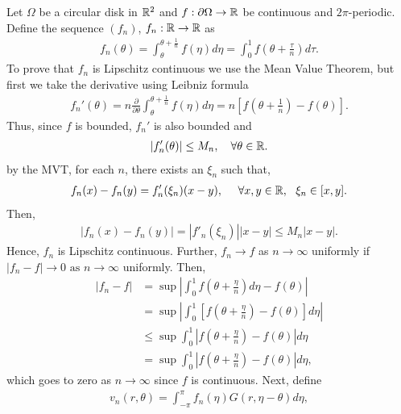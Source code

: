 \begin{questions}
\begin{solution}
Let $\Omega$ be a circular disk in $\mathbb{R}^2$ and $f:\partial \Omega\rightarrow\mathbb{R}$ be continuous and $2\pi$-periodic. Define the sequence $(f_n)$, $f_n:\mathbb{R}\rightarrow\mathbb{R}$ as
\begin{align*}
f_n(\theta)=\int_\theta^{\theta+\frac{1}{n}}f(\eta)d\eta=\int_0^1f(\theta+\frac{\tau}{n})d\tau.
\end{align*}
To prove that $f_n$ is Lipschitz continuous we use the Mean Value Theorem, but first we take the derivative using Leibniz formula
\begin{align*}
f_n'(\theta)=n\frac{\partial}{\partial\theta}\int_\theta^{\theta+\frac{1}{n}}f(\eta)d\eta=n\left[f\left(\theta+\frac{1}{n}\right)-f(\theta)\right].
\end{align*}
Thus, since $f$ is bounded, $f_n'$ is also bounded and
\begin{align*}
\left|f_n'(\theta)\right|\leq M_n,~~~\forall\theta\in\mathbb{R}.
\end{align*}
by the MVT, for each $n$, there exists an $\xi_n$ such that,
\begin{align*}
f_n(x)-f_n(y)=f'_n(\xi_n)(x-y),~~~~\forall x,y\in\mathbb{R},~~\xi_n\in[x,y].
\end{align*}
Then,
\begin{align*}
\left|f_n(x)-f_n(y)\right|=|f'_n(\xi_n)||x-y|\leq M_n|x-y|.
\end{align*}
Hence, $f_n$ is Lipschitz continuous. Further, $f_n\rightarrow f$ as $n\rightarrow\infty$ uniformly if $\left|f_n-f\right|\rightarrow 0\text{ as }n\rightarrow\infty$ uniformly. Then,
\begin{align*}
\left|f_n-f\right|&=\sup\left|\int_0^1f\left(\theta+\frac{\eta}{n}\right)d\eta-f(\theta)\right|\\
&=\sup\left|\int_0^1\left[f\left(\theta+\frac{\eta}{n}\right)-f(\theta)\right]d\eta\right|\\
&\leq\sup\int_0^1\left|f\left(\theta+\frac{\eta}{n}\right)-f(\theta)\right|d\eta\\
&=\sup\int_0^1\left|f\left(\theta+\frac{\eta}{n}\right)-f(\theta)\right|d\eta,
\end{align*}
which goes to zero as $n\rightarrow\infty$ since $f$ is continuous. Next, define
\begin{align*}
v_n(r,\theta)=\int_{-\pi}^{\pi}f_n(\eta)G(r,\eta-\theta)d\eta,
\end{align*}

\end{solution}
\end{questions}
